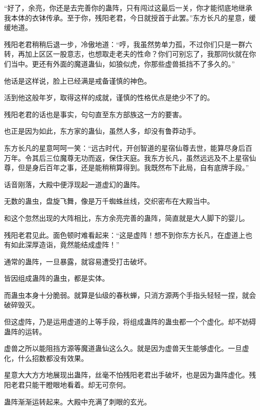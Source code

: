 
\begin{this_body}



“好了，余亮，你还是去完善你的蛊阵，只有闯过这最后一关，你才能彻底地继承我本体的衣钵传承。至于你，残阳老君，今日就授首于此罢。”东方长凡的星意，缓缓地道。

残阳老君稍稍后退一步，冷傲地道：“哼，我虽然势单力孤，不过你们只是一群六转，再加上区区一股意志，也想取走老夫的性命？你们可别忘了，我那同伙就在你们当中。更还有外面的魔道蛊仙，如狼似虎，你那些虚兽抵挡不了多久的。”

他话是这样说，脸上已经满是戒备谨慎的神色。

活到他这般年岁，取得这样的成就，谨慎的性格优点是绝少不了的。

残阳老君的话也是事实，句句直至东方部族这一方的要害。

也正是因为如此，东方家的蛊仙，虽然人多，却没有鲁莽动手。

东方长凡的星意呵呵一笑：“远古时代，开创智道的星宿仙尊去世，能算尽身后百万年。令其后三位魔尊无功而返，保住天庭。我东方长凡，虽然远远及不上星宿仙尊，但是身后百年之事，还是能稍稍算得到。我既然布下此局，自有底牌手段。”

话音刚落，大殿中便浮现起一道虚幻的蛊阵。

无数的蛊虫，盘旋飞舞，像是万千蜘蛛丝线，交织密布在大殿当中。

和这个忽然出现的大阵相比，东方余亮完善的蛊阵，简直就是大人脚下的婴儿。

残阳老君见此。面色顿时难看起来：“这是虚阵！想不到你东方长凡，在虚道上也有如此深厚造诣，竟然能结成虚阵！”

通常的蛊阵，一旦暴露，就容易遭受打击破坏。

皆因组成蛊阵的蛊虫，都是实体。

而蛊虫本身十分脆弱。就算是仙级的春秋蝉，只消方源两个手指头轻轻一捏，就会破碎毁灭。

但这虚阵，乃是运用虚道的上等手段，将组成蛊阵的蛊虫都一个个虚化。却不妨碍蛊阵的运转。

虚兽之所以能阻挡方源等魔道蛊仙这么久。就是因为虚兽天生能够虚化。一旦虚化，什么招数都没有效果。

星意大大方方地展现出蛊阵，丝毫不怕残阳老君出手破坏，也是因为蛊阵虚化。残阳老君只能干瞪眼地看着。却无可奈何。

蛊阵渐渐运转起来。大殿中充满了刺眼的玄光。


\end{this_body}
